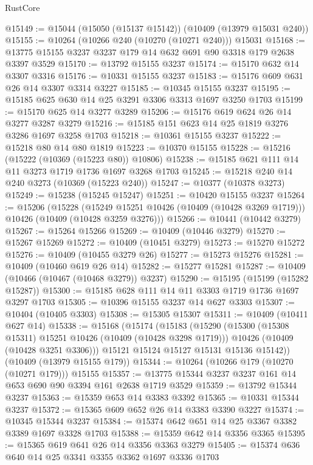 \begin{lexlean}{RustCore}
\begin{coremodule}
@15149 := @15044 (@15050 (@15137 @15142)) (@10409 (@13979 @15031 @240))
@15155 := @10264 (@10266 @240 (@10270 (@10271 @240))) @15031
@15168 := @13775 @15155 @3237 @3237 @179 @14 @632 @691 @90 @3318 @179 @2638 @3397 @3529
@15170 := @13792 @15155 @3237
@15174 := @15170 @632 @14 @3307 @3316
@15176 := @10331 @15155 @3237
@15183 := @15176 @609 @631 @26 @14 @3307 @3314 @3227
@15185 := @10345 @15155 @3237
@15195 := @15185 @625 @630 @14 @25 @3291 @3306 @3313 @1697 @3250 @1703
@15199 := @15170 @625 @14 @3277 @3289
@15206 := @15176 @619 @624 @26 @14 @3277 @3287 @3279
@15216 := @15185 @151 @623 @14 @25 @1819 @3276 @3286 @1697 @3258 @1703
@15218 := @10361 @15155 @3237
@15222 := @15218 @80 @14 @80 @1819
@15223 := @10370 @15155
@15228 := @15216 (@15222 (@10369 (@15223 @80)) @10806)
@15238 := @15185 @621 @111 @14 @11 @3273 @1719 @1736 @1697 @3268 @1703
@15245 := @15218 @240 @14 @240 @3273 (@10369 (@15223 @240))
@15247 := @10377 (@10378 @3273)
@15249 := @15238 (@15245 @15247)
@15251 := @10420 @15155 @3237
@15264 := @15206
    (@15228
      (@15249 @15251 @10426 (@10409 (@10428 @3269 @1719)))
      @10426
      (@10409 (@10428 @3259 @3276)))
@15266 := @10441 (@10442 @3279)
@15267 := @15264 @15266
@15269 := @10409 (@10446 @3279)
@15270 := @15267 @15269
@15272 := @10409 (@10451 @3279)
@15273 := @15270 @15272
@15276 := @10409 (@10455 @3279 @26)
@15277 := @15273 @15276
@15281 := @10409 (@10460 @619 @26 @14)
@15282 := @15277 @15281
@15287 := @10409 (@10466 (@10467 (@10468 @3279)) @3237)
@15290 := @15195 (@15199 (@15282 @15287))
@15300 := @15185 @628 @111 @14 @11 @3303 @1719 @1736 @1697 @3297 @1703
@15305 := @10396 @15155 @3237 @14 @627 @3303
@15307 := @10404 (@10405 @3303)
@15308 := @15305 @15307
@15311 := @10409 (@10411 @627 @14)
@15338 := @15168
    (@15174
      (@15183
        (@15290
          (@15300 (@15308 @15311) @15251 @10426 (@10409 (@10428 @3298 @1719)))
          @10426
          (@10409 (@10428 @3251 @3306)))
        @15121
        @15124
        @15127
        @15131
        @15136
        @15142))
    (@10409 (@13979 @15155 @179))
@15344 := @10264 (@10266 @179 (@10270 (@10271 @179))) @15155
@15357 := @13775 @15344 @3237 @3237 @161 @14 @653 @690 @90 @3394 @161 @2638 @1719 @3529
@15359 := @13792 @15344 @3237
@15363 := @15359 @653 @14 @3383 @3392
@15365 := @10331 @15344 @3237
@15372 := @15365 @609 @652 @26 @14 @3383 @3390 @3227
@15374 := @10345 @15344 @3237
@15384 := @15374 @642 @651 @14 @25 @3367 @3382 @3389 @1697 @3328 @1703
@15388 := @15359 @642 @14 @3356 @3365
@15395 := @15365 @619 @641 @26 @14 @3356 @3363 @3279
@15405 := @15374 @636 @640 @14 @25 @3341 @3355 @3362 @1697 @3336 @1703

\end{coremodule}
\end{lexlean}
